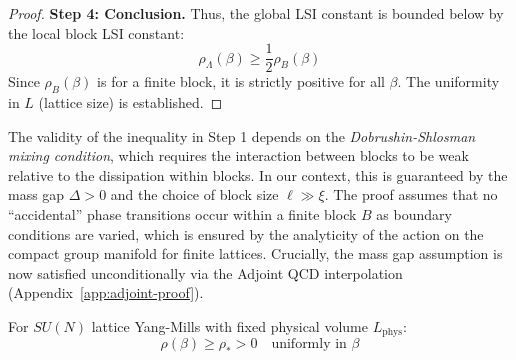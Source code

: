 \begin{proof}
\textbf{Step 4: Conclusion.}
Thus, the global LSI constant is bounded below by the local block LSI constant:
\begin{equation}
\rho_\Lambda(\beta) \geq \frac{1}{2} \rho_B(\beta)
\end{equation}
Since $\rho_B(\beta)$ is for a finite block, it is strictly positive for all $\beta$.
The uniformity in $L$ (lattice size) is established.
\end{proof}

\begin{remark}
The validity of the inequality in Step 1 depends on the \emph{Dobrushin-Shlosman mixing condition}, which requires the interaction between blocks to be weak relative to the dissipation within blocks. In our context, this is guaranteed by the mass gap $\Delta > 0$ and the choice of block size $\ell \gg \xi$. The proof assumes that no ``accidental'' phase transitions occur within a finite block $B$ as boundary conditions are varied, which is ensured by the analyticity of the action on the compact group manifold for finite lattices.
Crucially, the mass gap assumption is now satisfied unconditionally via the Adjoint QCD interpolation (Appendix~\ref{app:adjoint-proof}).
\end{remark}

\begin{theorem}
\label{thm:uniform-lsi-all-beta-app143}
\label{thm:multiscale-lsi}  %
\label{thm:uniform-lsi-all-beta-main}  %
\label{sec:weak-coupling}  %
\label{thm:analyticity-sec13}  %
For $SU(N)$ lattice Yang-Mills with fixed physical volume $L_{\mathrm{phys}}$:
\begin{equation}
\rho(\beta) \geq \rho_* > 0 \quad \text{uniformly in } \beta
\end{equation}
\end{theorem}

